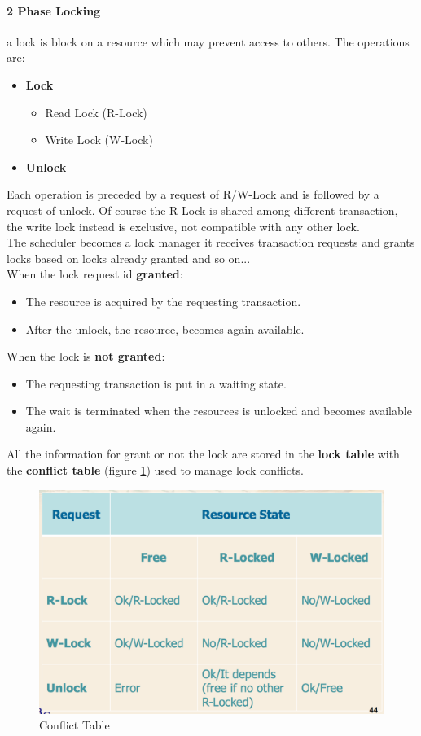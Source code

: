 \documentclass[12pt]{article}
\begin{document}
\paragraph{2 Phase Locking} a lock is block on a resource which may prevent access to others. The operations are:
\begin{itemize}
  \item \textbf{Lock}
  \begin{itemize}
    \item Read Lock (R-Lock)
    \item Write Lock (W-Lock)
  \end{itemize}
  \item \textbf{Unlock}
\end{itemize}
Each operation is preceded by a request of R/W-Lock and is followed by a request of unlock. Of course the R-Lock is shared among different transaction, the write lock instead is exclusive, not compatible with any other lock.\\
The scheduler becomes a lock manager it receives transaction requests and grants locks based on locks already granted and so on...\\
When the lock request id \textbf{granted}:
\begin{itemize}
  \item The resource is acquired by the requesting transaction.
  \item After the unlock, the resource, becomes again available.
\end{itemize}
When the lock is \textbf{not granted}:
\begin{itemize}
  \item The requesting transaction is put in a waiting state.
  \item The wait is terminated when the resources is unlocked and becomes available again.
\end{itemize}
All the information for grant or not the lock are stored in the \textbf{lock table} with the \textbf{conflict table} (figure \ref{fig:conflict}) used to manage lock conflicts.

\begin{figure}[h!]
  \includegraphics[width=\linewidth]{images/conflict.png}
  \caption{Conflict Table}
  \label{fig:conflict}
\end{figure}
\end{document}
